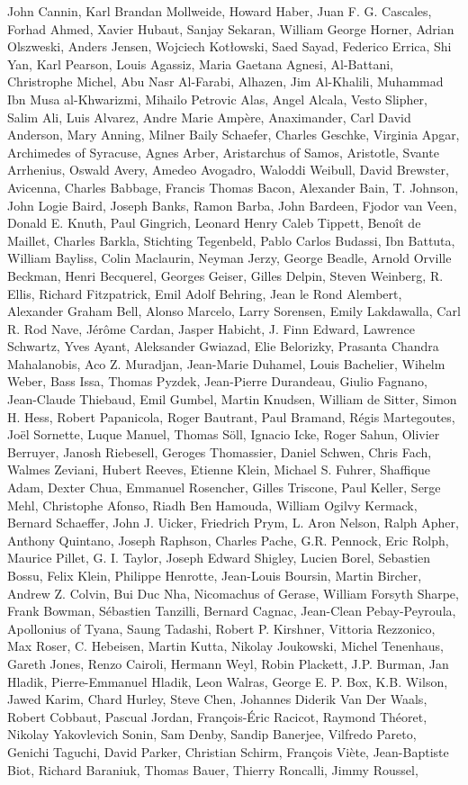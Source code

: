 \begin{spacing}{0.5}
\begin{tiny}
	John Cannin, Karl Brandan Mollweide, Howard Haber, Juan F. G. Cascales, Forhad Ahmed, Xavier Hubaut, Sanjay Sekaran, William George Horner, Adrian Olszweski, Anders Jensen, Wojciech Kotłowski, Saed Sayad, Federico Errica, Shi Yan, Karl Pearson, Louis Agassiz, Maria Gaetana Agnesi, Al-Battani, Christrophe Michel, Abu Nasr Al-Farabi, Alhazen, Jim Al-Khalili, Muhammad Ibn Musa al-Khwarizmi, Mihailo Petrovic Alas, Angel Alcala, Vesto Slipher, Salim Ali, Luis Alvarez, Andre Marie Ampère, Anaximander, Carl David Anderson, Mary Anning, Milner Baily Schaefer, Charles Geschke, Virginia Apgar, Archimedes of Syracuse, Agnes Arber, Aristarchus of Samos, Aristotle, Svante Arrhenius, Oswald Avery, Amedeo Avogadro, Waloddi Weibull, David Brewster, Avicenna, Charles Babbage, Francis Thomas Bacon, Alexander Bain, T. Johnson, John Logie Baird, Joseph Banks, Ramon Barba, John Bardeen, Fjodor van Veen, Donald E. Knuth, Paul Gingrich, Leonard Henry Caleb Tippett, Benoît de Maillet, Charles Barkla, Stichting Tegenbeld, Pablo Carlos Budassi, Ibn Battuta, William Bayliss, Colin Maclaurin, Neyman Jerzy, George Beadle, Arnold Orville Beckman, Henri Becquerel, Georges Geiser, Gilles Delpin, Steven Weinberg, R. Ellis, Richard Fitzpatrick, Emil Adolf Behring, Jean le Rond Alembert, Alexander Graham Bell, Alonso Marcelo, Larry Sorensen, Emily Lakdawalla, Carl R. Rod Nave, Jérôme Cardan, Jasper Habicht, J. Finn Edward, Lawrence Schwartz, Yves Ayant, Aleksander Gwiazad, Elie Belorizky, Prasanta Chandra Mahalanobis, Aco Z. Muradjan, Jean-Marie Duhamel, Louis Bachelier, Wihelm Weber, Bass Issa, Thomas Pyzdek, Jean-Pierre Durandeau, Giulio Fagnano, Jean-Claude Thiebaud, Emil Gumbel, Martin Knudsen, William de Sitter, Simon H. Hess, Robert Papanicola, Roger Bautrant, Paul Bramand, Régis Martegoutes, Joël Sornette, Luque Manuel, Thomas Söll, Ignacio Icke, Roger Sahun, Olivier Berruyer, Janosh Riebesell, Geroges Thomassier, Daniel Schwen, Chris Fach, Walmes Zeviani, Hubert Reeves, Etienne Klein, Michael S. Fuhrer, Shaffique Adam, Dexter Chua, Emmanuel Rosencher, Gilles Triscone, Paul Keller, Serge Mehl, Christophe Afonso, Riadh Ben Hamouda, William Ogilvy Kermack, Bernard Schaeffer, John J. Uicker, Friedrich Prym, L. Aron Nelson, Ralph Apher, Anthony Quintano, Joseph Raphson, Charles Pache, G.R. Pennock, Eric Rolph, Maurice Pillet, G. I. Taylor, Joseph Edward Shigley, Lucien Borel, Sebastien Bossu, Felix Klein, Philippe Henrotte, Jean-Louis Boursin, Martin Bircher, Andrew Z. Colvin, Bui Duc Nha, Nicomachus of Gerase, William Forsyth Sharpe, Frank Bowman, Sébastien Tanzilli, Bernard Cagnac, Jean-Clean Pebay-Peyroula, Apollonius of Tyana, Saung Tadashi, Robert P. Kirshner, Vittoria Rezzonico, Max Roser, C. Hebeisen, Martin Kutta, Nikolay Joukowski, Michel Tenenhaus, Gareth Jones, Renzo Cairoli, Hermann Weyl, Robin Plackett, J.P. Burman, Jan Hladik, Pierre-Emmanuel Hladik, Leon Walras, George E. P. Box, K.B. Wilson, Jawed Karim, Chard Hurley, Steve Chen, Johannes Diderik Van Der Waals, Robert Cobbaut, Pascual Jordan, François-Éric Racicot, Raymond Théoret, Nikolay Yakovlevich Sonin, Sam Denby, Sandip Banerjee, Vilfredo Pareto, Genichi Taguchi, David Parker, Christian Schirm, François Viète, Jean-Baptiste Biot, Richard Baraniuk, Thomas Bauer, Thierry Roncalli, Jimmy Roussel, 
\end{tiny}
\end{spacing}

